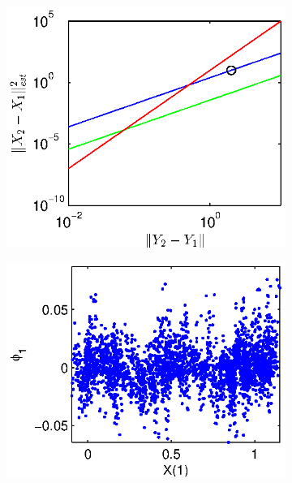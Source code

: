 \documentclass[1p]{elsarticle}
\begin{document}
\begin{figure}
\begin{subfigure}{0.5\textwidth}
\includegraphics[width=\textwidth]{changing_parameters_error_terms_2}
\caption{}
\end{subfigure}
\begin{subfigure}{0.5\textwidth}
\includegraphics[width=\textwidth]{changing_parameters_NIV_corr_2}
\caption{}
\end{subfigure}


\end{figure}
\end{document}
